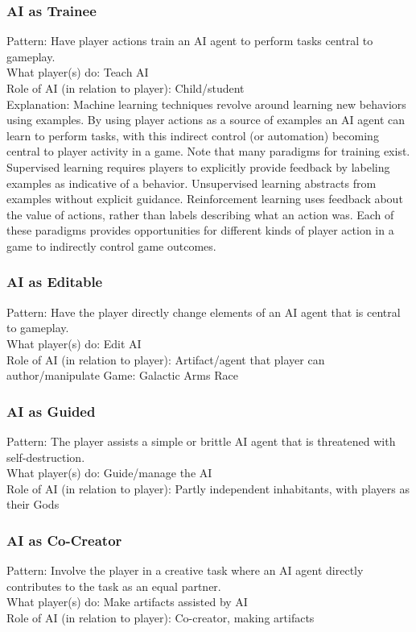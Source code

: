 \documentclass[MGS,Master,english]{twbook}%
\begin{document}
\subsubsection{AI as Trainee}
Pattern: Have player actions train an AI agent to perform tasks central to gameplay. \\
What player(s) do: Teach AI\\
Role of AI (in relation to player): Child/student\\
Explanation: Machine learning techniques revolve around learning new behaviors using examples. By using player actions as a source of examples an AI agent can learn to perform tasks, with this indirect control (or automation) becoming central to player activity in a game. Note that many paradigms for training exist. Supervised learning requires players to explicitly provide feedback by labeling examples as indicative of a behavior. Unsupervised learning abstracts from examples without explicit guidance. Reinforcement learning uses feedback about the value of actions, rather than labels describing what an action was. Each of these paradigms provides opportunities for different kinds of player action in a game to indirectly control game outcomes.
\subsubsection{AI as Editable}
Pattern: Have the player directly change elements of an AI agent that is central to gameplay.\\
What player(s) do: Edit AI\\
Role of AI (in relation to player): Artifact/agent that player can author/manipulate
Game: Galactic Arms Race
\subsubsection{AI as Guided}
Pattern: The player assists a simple or brittle AI agent that is threatened with self-destruction.\\
What player(s) do: Guide/manage the AI\\
Role of AI (in relation to player): Partly independent inhabitants, with players as their Gods
\subsubsection{AI as Co-Creator}
Pattern: Involve the player in a creative task where an AI agent directly contributes to the task as an equal partner.\\
What player(s) do: Make artifacts assisted by AI\\
Role of AI (in relation to player): Co-creator, making artifacts
\end{document}

